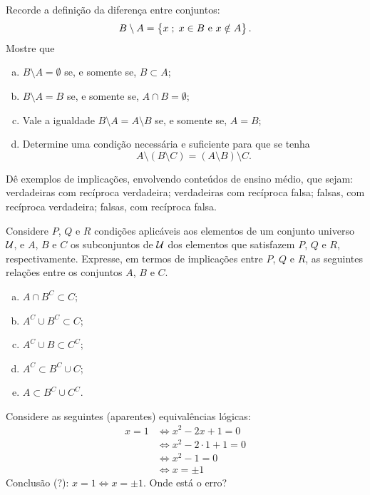 \begin{exercise}
Recorde a definição da diferença entre conjuntos:
  $$B \setminus A = \left\{ x \;;\; x \in B \text { e } x \notin A\right\}.$$
  Mostre que
    \begin{enumerate}[a.]
      \item $B \setminus A = \emptyset$ se, e somente se, $B \subset
      A$;
      \item $B \setminus A = B$ se, e somente se, $A \cap B =
      \emptyset$;
      \item Vale a igualdade $B \setminus A = A \setminus B$ se, e
      somente se, $A = B$;
      \item Determine uma condição necessária e suficiente para que
      se tenha $$A \setminus \left(B \setminus C \right) = \left(A
      \setminus B \right) \setminus C.$$
    \end{enumerate}
\end{exercise}

\begin{exercise}
Dê exemplos de implicações, envolvendo conteúdos de ensino
  médio, que sejam: verdadeiras com recíproca verdadeira;
  verdadeiras com recíproca falsa; falsas, com recíproca verdadeira;
  falsas, com recíproca falsa.
\end{exercise}

\begin{exercise}
Considere $P$, $Q$ e $R$ condições aplicáveis aos elementos
de um conjunto universo $\mathcal{U}$, e $A$, $B$ e $C$ os subconjuntos de
$\mathcal{U}$ dos elementos que satisfazem $P$, $Q$ e $R$, respectivamente.
Expresse, em termos de implicações entre $P$, $Q$ e $R$, as
seguintes relações entre os conjuntos $A$, $B$ e $C$.
\begin{enumerate}[a.]
\item $A \cap B^C \subset C$;
\item $A^C \cup B^C \subset C$;
\item $A^C \cup B \subset C^C$;
\item $A^C \subset B^C \cup C$;
\item $A \subset B^C \cup C^C$.
\end{enumerate}
\end{exercise}

\begin{exercise}
Considere as seguintes (aparentes) equivalências lógicas:
\begin{align*}
x=1 & \iff x^2 -2x +1 = 0 \\
& \iff x^2 -2 \cdot 1 +1 =0 \\
& \iff x^2 - 1 =0 \\
& \iff x = \pm 1
\end{align*}
Conclusão (?): $x=1 \iff x= \pm 1$. Onde está o erro?
\end{exercise}

